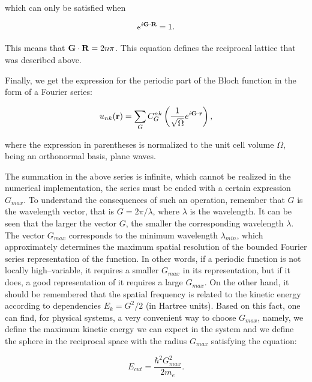 which can only be satisfied when

\begin{equation}
    e^{i\mathbf{G}\cdot\mathbf{R}}=1.
    \label{fourier_wavefunction4}
\end{equation}

This means that $\mathbf{G}\cdot\mathbf{R}=2n\pi$.
This equation defines the reciprocal lattice that was described above.

Finally, we get the expression for the periodic part of the Bloch function in the form of a Fourier series:

\begin{equation}
    u_{nk}(\mathbf{r})=\sum_GC^{nk}_G\left(\frac{1}{\sqrt{\Omega}}e^{i\mathbf{G}\cdot\mathbf{r}}\right),
    \label{planewave_basis}
\end{equation}

where the expression in parentheses is normalized to the unit cell volume $\Omega$, being an orthonormal basis, plane waves.

The summation in the above series is infinite, which cannot be realized in the numerical implementation, the series must be ended with a certain expression $G_{max}$.
To understand the consequences of such an operation, remember that $G$ is the wavelength vector, that is $G=2\pi/\lambda$, where $\lambda$ is the wavelength.
It can be seen that the larger the vector $G$, the smaller the corresponding wavelength $\lambda$.
The vector $G_{max}$ corresponds to the minimum wavelength $\lambda_{min}$, which approximately determines the maximum spatial resolution of the bounded Fourier series representation of the function.
In other words, if a periodic function is not locally high--variable, it requires a smaller $G_{max}$ in its representation, but if it does, a good representation of it requires a large $G_{max}$.
On the other hand, it should be remembered that the spatial frequency is related to the kinetic energy according to dependencies $E_k=G^2/2$ (in Hartree units).
Based on this fact, one can find, for physical systems, a very convenient way to choose $G_{max}$, namely, we define the maximum kinetic energy we can expect in the system and we define the sphere in the reciprocal space with the radius $G_{max}$ satisfying the equation:

\begin{equation}
    E_{cut}=\frac{\hbar^2G_{max}^2}{2m_e}.
    \label{ecut}
\end{equation}

